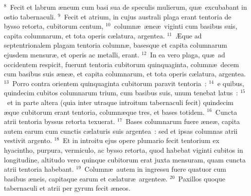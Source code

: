 ${}^{8}$~Fecit et labrum \ae neum cum basi sua de speculis mulierum, qu\ae\ excubabant in ostio tabernaculi.
${}^{9}$~Fecit et atrium, in cujus australi plaga erant tentoria de bysso retorta, cubitorum centum,
${}^{10}$~column\ae\ \ae ne\ae\ viginti cum basibus suis, capita columnarum, et tota operis c\ae latura, argentea.
${}^{11}$~\AE que ad septentrionalem plagam tentoria column\ae , basesque et capita columnarum ejusdem mensur\ae , et operis ac metalli, erant.
${}^{12}$~In ea vero plaga, qu\ae\ ad occidentem respicit, fuerunt tentoria cubitorum quinquaginta, column\ae\ decem cum basibus suis \ae ne\ae , et capita columnarum, et tota operis c\ae latura, argentea.
${}^{13}$~Porro contra orientem quinquaginta cubitorum paravit tentoria~:
${}^{14}$~e quibus, quindecim cubitos columnarum trium, cum basibus suis, unum tenebat latus~:
${}^{15}$~et in parte altera (quia inter utraque introitum tabernaculi fecit) quindecim \ae que cubitorum erant tentoria, column\ae que tres, et bases totidem.
${}^{16}$~Cuncta atrii tentoria byssus retorta texuerat.
${}^{17}$~Bases columnarum fuere \ae ne\ae , capita autem earum cum cunctis c\ae laturis suis argentea~: sed et ipsas columnas atrii vestivit argento.
${}^{18}$~Et in introitu ejus opere plumario fecit tentorium ex hyacintho, purpura, vermiculo, ac bysso retorta, quod habebat viginti cubitos in longitudine, altitudo vero quinque cubitorum erat juxta mensuram, quam cuncta atrii tentoria habebant.
${}^{19}$~Column\ae\ autem in ingressu fuere quatuor cum basibus \ae neis, capitaque earum et c\ae latur\ae\ argente\ae .
${}^{20}$~Paxillos quoque tabernaculi et atrii per gyrum fecit \ae neos.


